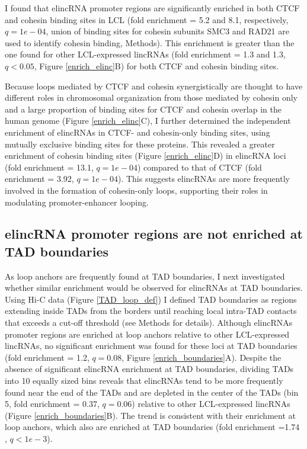 \documentclass[11pt,a4paper]{report}
\begin{document}
I found that elincRNA promoter regions are significantly enriched in both CTCF and cohesin binding sites in LCL (fold enrichment = 5.2 and 8.1, respectively, $q=1e-04$, union of binding sites for cohesin subunits SMC3 and RAD21 are used to identify cohesin binding, Methods). This enrichment is greater than the one found for other LCL-expressed lincRNAs (fold enrichment = 1.3 and 1.3, $q<0.05$, Figure \ref{enrich_elinc}B) for both CTCF and cohesin binding sites.

Because loops mediated by CTCF and cohesin synergistically are thought to have different roles in chromosomal organization from those mediated by cohesin only  \cite{Ji2016} and a large proportion of binding sites for CTCF and cohesin overlap in the human genome (Figure \ref{enrich_elinc}C)⁠, I further determined the independent enrichment of elincRNAs in CTCF- and cohesin-only binding sites, using mutually exclusive binding sites for these proteins. This revealed a greater enrichment of cohesin binding sites (Figure \ref{enrich_elinc}D) in elincRNA loci (fold enrichment = 13.1, $q=1e-04$) compared to that of CTCF (fold enrichment = 3.92, $q=1e-04$). This suggests elincRNAs are more frequently involved in the formation of cohesin-only loops, supporting their roles in modulating promoter-enhancer looping.

\subsection*{elincRNA promoter regions are not enriched at TAD boundaries}

As loop anchors are frequently found at TAD boundaries, I next investigated whether similar enrichment would be observed for elincRNAs at TAD boundaries. Using Hi-C data (Figure \ref{TAD_loop_def}) I defined TAD boundaries as regions extending inside TADs from the borders until reaching local intra-TAD contacts that exceeds a cut-off threshold (see Methods for details). Although elincRNAs promoter regions are enriched at loop anchors relative to other LCL-expressed lincRNAs, no significant enrichment was found for these loci  at TAD boundaries (fold enrichment = 1.2, $q=0.08$, Figure \ref{enrich_boundaries}A). Despite the absence of significant elincRNA enrichment at TAD boundaries, dividing TADs into 10 equally sized bins reveals that elincRNAs tend to be more frequently found near the end of the TADs and are depleted in the center of the TADs (bin 5, fold enrichment = 0.37, $q=0.06$) relative to other LCL-expressed lincRNAs (Figure \ref{enrich_boundaries}B). The trend is consistent with their enrichment at loop anchors, which also are enriched at TAD boundaries (fold enrichment =1.74 , $q<1e-3$).
\end{document}

